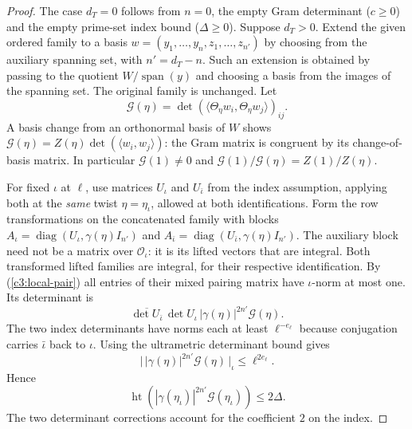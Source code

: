 \begin{proof}
The case $d_T=0$ follows from $n=0$, the empty Gram determinant
($c\ge0$) and the empty prime-set index bound ($\Delta\ge0$).
Suppose $d_T>0$. Extend the given ordered family to a basis
$w=(y_1,\ldots,y_n,z_1,\ldots,z_{n'})$ by choosing from the
auxiliary spanning set, with $n'=d_T-n$. Such an extension is
obtained by passing to the quotient $W/\operatorname{span}(y)$
and choosing a basis from the images of the spanning set.
The original family is unchanged. Let
\[
 \mathcal G(\eta)=\det(\langle\Theta_\eta w_i,
                            \Theta_\eta w_j\rangle)_{ij}.
\]
A basis change from an orthonormal basis of $W$ shows
$\mathcal G(\eta)=Z(\eta)\det(\langle w_i,w_j\rangle)$: the Gram
matrix is congruent by its change-of-basis matrix.
In particular $\mathcal G(1)\ne0$ and
$\mathcal G(1)/\mathcal G(\eta)=Z(1)/Z(\eta)$.

For fixed $\iota$ at $\ell$, use matrices $U_\iota$ and
$U_{\bar\iota}$ from the index assumption, applying both at the
\emph{same} twist $\eta=\eta_\iota$, allowed at both
identifications. Form the row transformations on the concatenated
family with blocks
$A_\iota=\operatorname{diag}(U_\iota,\gamma(\eta)I_{n'})$
and $A_{\bar\iota}=\operatorname{diag}(U_{\bar\iota},
\gamma(\eta)I_{n'})$. The auxiliary block need not be a matrix
over $\mathcal O_\iota$: it is its lifted vectors that are integral.
Both transformed lifted families are integral, for their
respective identification. By (\ref{c3:local-pair}) all entries
of their mixed pairing matrix have $\iota$-norm at most one.
Its determinant is
\[
 \overline{\det U_{\bar\iota}}\,\det U_\iota\,
 |\gamma(\eta)|^{2n'}\mathcal G(\eta).
\]
The two index determinants have norms each at least
$\ell^{-e_\ell}$ because conjugation carries $\bar\iota$ back
to $\iota$. Using the ultrametric determinant bound gives
\[
 \big|\,|\gamma(\eta)|^{2n'}\mathcal G(\eta)\,\big|_\iota
       \le\ell^{2e_\ell}.
\]
Hence
\begin{equation}\label{c3:local-height}
 \operatorname{ht}(|\gamma(\eta_\iota)|^{2n'}
                    \mathcal G(\eta_\iota))\le2\Delta .
\end{equation}
The two determinant corrections account for the coefficient $2$ on the index.


\end{proof}
